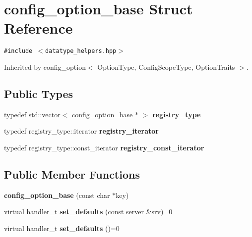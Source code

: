\hypertarget{structconfig__option__base}{
\section{config\_\-option\_\-base Struct Reference}
\label{structconfig__option__base}
}
{\tt \#include $<$datatype\_\-helpers.hpp$>$}

Inherited by config\_\-option$<$ OptionType, ConfigScopeType, OptionTraits $>$.

\subsection*{Public Types}
\begin{CompactItemize}
\item 
\hypertarget{structconfig__option__base_b71046712f2629513bf074eb030dc3b7}{
typedef std::vector$<$ \hyperlink{structconfig__option__base}{config\_\-option\_\-base} $\ast$ $>$ \textbf{registry\_\-type}}
\label{structconfig__option__base_b71046712f2629513bf074eb030dc3b7}

\item 
\hypertarget{structconfig__option__base_23ce095890ffe80c8bc31f7cb90d3f4f}{
typedef registry\_\-type::iterator \textbf{registry\_\-iterator}}
\label{structconfig__option__base_23ce095890ffe80c8bc31f7cb90d3f4f}

\item 
\hypertarget{structconfig__option__base_badbd3acf8284e0cdb3a0e637498c6e7}{
typedef registry\_\-type::const\_\-iterator \textbf{registry\_\-const\_\-iterator}}
\label{structconfig__option__base_badbd3acf8284e0cdb3a0e637498c6e7}

\end{CompactItemize}
\subsection*{Public Member Functions}
\begin{CompactItemize}
\item 
\hypertarget{structconfig__option__base_5f87eab8c0be092869b305fd1ef3f133}{
\textbf{config\_\-option\_\-base} (const char $\ast$key)}
\label{structconfig__option__base_5f87eab8c0be092869b305fd1ef3f133}

\item 
\hypertarget{structconfig__option__base_ac53aa895594570d1707c302909d266c}{
virtual handler\_\-t \textbf{set\_\-defaults} (const server \&srv)=0}
\label{structconfig__option__base_ac53aa895594570d1707c302909d266c}

\item 
\hypertarget{structconfig__option__base_c2eb1e7e5bbc509803cd19ffeeda331e}{
virtual handler\_\-t \textbf{set\_\-defaults} ()=0}
\label{structconfig__option__base_c2eb1e7e5bbc509803cd19ffeeda331e}

\end{CompactItemize}
